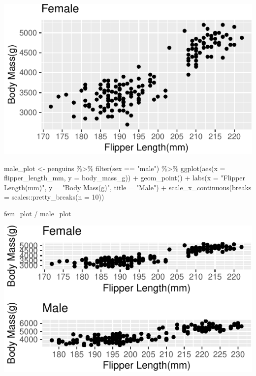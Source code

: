 \documentclass[]{tufte-handout}
\newenvironment{Shaded}{}{}
\newcommand{\AttributeTok}[1]{\textcolor[rgb]{0.49,0.56,0.16}{#1}}
\newcommand{\DecValTok}[1]{\textcolor[rgb]{0.25,0.63,0.44}{#1}}
\newcommand{\FunctionTok}[1]{\textcolor[rgb]{0.02,0.16,0.49}{#1}}
\newcommand{\NormalTok}[1]{#1}
\newcommand{\OtherTok}[1]{\textcolor[rgb]{0.00,0.44,0.13}{#1}}
\newcommand{\SpecialCharTok}[1]{\textcolor[rgb]{0.25,0.44,0.63}{#1}}
\newcommand{\StringTok}[1]{\textcolor[rgb]{0.25,0.44,0.63}{#1}}
\begin{document}
\begin{center}\includegraphics{R-Guide_files/figure-latex/female-plot-for-combo-1} \end{center}

\begin{Shaded}
\begin{Highlighting}[]
\NormalTok{male\_plot }\OtherTok{\textless{}{-}}\NormalTok{ penguins }\SpecialCharTok{\%\textgreater{}\%}
  \FunctionTok{filter}\NormalTok{(sex }\SpecialCharTok{==} \StringTok{"male"}\NormalTok{) }\SpecialCharTok{\%\textgreater{}\%}
  \FunctionTok{ggplot}\NormalTok{(}\FunctionTok{aes}\NormalTok{(}\AttributeTok{x =}\NormalTok{ flipper\_length\_mm, }\AttributeTok{y =}\NormalTok{ body\_mass\_g)) }\SpecialCharTok{+}
  \FunctionTok{geom\_point}\NormalTok{() }\SpecialCharTok{+}
  \FunctionTok{labs}\NormalTok{(}\AttributeTok{x =} \StringTok{"Flipper Length(mm)"}\NormalTok{, }\AttributeTok{y =} \StringTok{"Body Mass(g)"}\NormalTok{, }\AttributeTok{title =} \StringTok{"Male"}\NormalTok{) }\SpecialCharTok{+}
  \FunctionTok{scale\_x\_continuous}\NormalTok{(}\AttributeTok{breaks =}\NormalTok{ scales}\SpecialCharTok{::}\FunctionTok{pretty\_breaks}\NormalTok{(}\AttributeTok{n =} \DecValTok{10}\NormalTok{))}


\NormalTok{fem\_plot }\SpecialCharTok{/}\NormalTok{ male\_plot}
\end{Highlighting}
\end{Shaded}

\begin{center}\includegraphics{R-Guide_files/figure-latex/female-plot-for-combo-2} \end{center}
\end{document}

